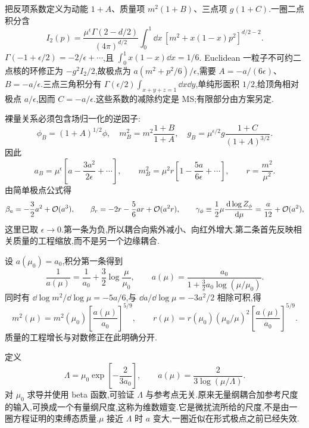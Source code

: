把反项系数定义为动能 $1+A$、质量项 $m^2(1+B)$、三点项 $g(1+C)$.一圈二点积分含
\begin{equation}
 I_2(p)=\frac{\mu^\epsilon\Gamma(2-d/2)}{(4\pi)^{d/2}}
       \int_0^1\dd x\,[m^2+x(1-x)p^2]^{d/2-2}.
\end{equation}
$\Gamma(-1+\epsilon/2)=-2/\epsilon+\cdots$,且
$\int_0^1x(1-x)\dd x=1/6$.
Euclidean 一粒子不可约二点核的环修正为 $-g^2I_2/2$,故极点为 $a(m^2+p^2/6)/\epsilon$,需要 $A=-a/(6\epsilon)$、$B=-a/\epsilon$.三点三角积分有
$\Gamma(\epsilon/2)\int_{x+y+z=1}\dd x\dd y$,单纯形面积 $1/2$,给顶角相对极点 $a/\epsilon$,因而 $C=-a/\epsilon$.这些系数的减除约定是 MS;有限部分由方案另定.

裸量关系必须包含场归一化的逆因子:
\begin{equation}
 \phi_B=(1+A)^{1/2}\phi,\quad
 m_B^2=m^2\frac{1+B}{1+A},\quad
 g_B=\mu^{\epsilon/2}g\frac{1+C}{(1+A)^{3/2}}.
 \label{eq:phi3-bare-relations}
\end{equation}
因此
\begin{equation}
 a_B=\mu^\epsilon\left[a-\frac{3a^2}{2\epsilon}+\cdots\right],
 \qquad m_B^2=\mu^2r\left[1-\frac{5a}{6\epsilon}+\cdots\right],
 \qquad r=\frac{m^2}{\mu^2}.
\end{equation}
由简单极点公式得
\begin{equation}
 \beta_a=-\frac32a^2+\mathcal O(a^3),\qquad
 \beta_r=-2r-\frac56ar+\mathcal O(a^2r),\qquad
 \gamma_\phi\equiv\frac12\mu\frac{\,\mathrm d\log Z_\phi}{\,\mathrm d\mu}
       =\frac a{12}+\mathcal O(a^2),
 \label{eq:phi3-six-d-beta}
\end{equation}
这里已取 $\epsilon\to0$.第一条为负,所以耦合向紫外减小、向红外增大.第二条首先反映相关质量的工程缩放,而不是另一个边缘耦合.

设 $a(\mu_0)=a_0$,积分第一条得到
\begin{equation}
 \frac1{a(\mu)}=\frac1{a_0}+\frac32\log\frac\mu{\mu_0},\qquad
 a(\mu)=\frac{a_0}{1+\tfrac32a_0\log(\mu/\mu_0)}.
 \label{eq:phi3-running-alpha}
\end{equation}
同时有 $\dd\log m^2/\dd\log\mu=-5a/6$,与 $\dd a/\dd\log\mu=-3a^2/2$ 相除可积,得
\begin{equation}
 m^2(\mu)=m^2(\mu_0)\left[\frac{a(\mu)}{a_0}\right]^{5/9},\qquad
 r(\mu)=r(\mu_0)(\mu_0/\mu)^2
              \left[\frac{a(\mu)}{a_0}\right]^{5/9}.
\end{equation}
质量的工程增长与对数修正在此明确分开.

定义
\begin{equation}
 \Lambda=\mu_0\exp\left[-\frac2{3a_0}\right],\qquad
 a(\mu)=\frac2{3\log(\mu/\Lambda)}.
 \label{eq:phi3-dimensional-transmutation}
\end{equation}
对 $\mu_0$ 求导并使用 beta 函数,可验证 $\Lambda$ 与参考点无关.原来无量纲耦合加参考尺度的输入,可换成一个有量纲尺度,这称为维数嬗变.它是微扰流所给的尺度,不是由一圈方程证明的束缚态质量.$\mu$ 接近 $\Lambda$ 时 $a$ 变大,一圈近似在形式极点之前已经失效.

